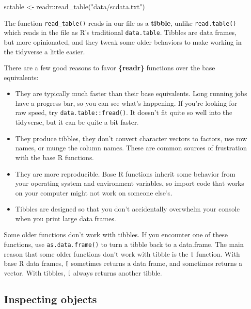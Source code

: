\documentclass[
]{book}
\newenvironment{Shaded}{\begin{snugshade}}{\end{snugshade}}
\newcommand{\FunctionTok}[1]{\textcolor[rgb]{0.00,0.00,0.00}{#1}}
\newcommand{\NormalTok}[1]{#1}
\newcommand{\OtherTok}[1]{\textcolor[rgb]{0.56,0.35,0.01}{#1}}
\newcommand{\SpecialCharTok}[1]{\textcolor[rgb]{0.00,0.00,0.00}{#1}}
\newcommand{\StringTok}[1]{\textcolor[rgb]{0.31,0.60,0.02}{#1}}
\begin{document}
\begin{Shaded}
\begin{Highlighting}[]
\NormalTok{sctable }\OtherTok{\textless{}{-}}\NormalTok{ readr}\SpecialCharTok{::}\FunctionTok{read\_table}\NormalTok{(}\StringTok{"data/scdata.txt"}\NormalTok{)}
\end{Highlighting}
\end{Shaded}

The function \texttt{read\_table()} reads in our file as a \textbf{tibble}, unlike \texttt{read.table()} which reads in the file as R's traditional \texttt{data.table}. Tibbles are data frames, but more opinionated, and they tweak some older behaviors to make working in the tidyverse a little easier.

There are a few good reasons to favor \textbf{\{readr\}} functions over the base equivalents:

\begin{itemize}
\item
  They are typically much faster than their base equivalents. Long running jobs have a progress bar, so you can see what's happening. If you're looking for raw speed, try \texttt{data.table::fread()}. It doesn't fit quite so well into the tidyverse, but it can be quite a bit faster.
\item
  They produce tibbles, they don't convert character vectors to factors, use row names, or munge the column names. These are common sources of frustration with the base R functions.
\item
  They are more reproducible. Base R functions inherit some behavior from your operating system and environment variables, so import code that works on your computer might not work on someone else's.
\item
  Tibbles are designed so that you don't accidentally overwhelm your console when you print large data frames.
\end{itemize}

Some older functions don't work with tibbles. If you encounter one of these functions, use \texttt{as.data.frame()} to turn a tibble back to a data.frame. The main reason that some older functions don't work with tibble is the \texttt{{[}} function. With base R data frames, \texttt{{[}} sometimes returns a data frame, and sometimes returns a vector. With tibbles, \texttt{{[}} always returns another tibble.

\hypertarget{inspecting-objects}{%
\subsection*{Inspecting objects}\label{inspecting-objects}}
\end{document}
